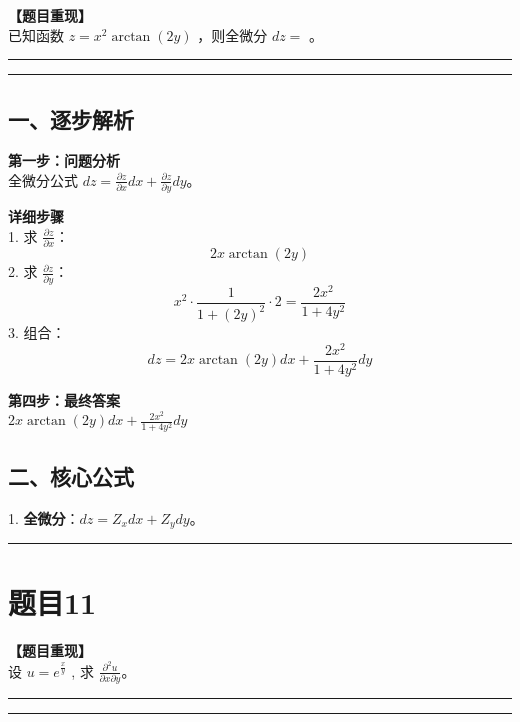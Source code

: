 \documentclass[12pt, a4paper]{ctexart}
\newcommand{\TopSeparator}{
    \par\noindent\rule{\textwidth}{1.5pt}\vspace{0.5em} %
}
\newcommand{\AnalysisSeparator}{
    \par\noindent\rule{\textwidth}{0.5pt}\vspace{0.2em}\hrule\vspace{0.5em} %
}
\newenvironment{RedAnalysis}{
    \par
    \color{red} %
}{
    \par
    \color{black} %
}
\begin{document}
\textbf{【题目重现】} \\
已知函数 $ z = x^{2} \arctan(2y) $ ，则全微分 $ dz = $ \underline{\hspace{2cm}}。

\AnalysisSeparator

\begin{RedAnalysis}

\subsection*{一、逐步解析}

\textbf{第一步：问题分析} \\
全微分公式 $dz = \frac{\partial z}{\partial x}dx + \frac{\partial z}{\partial y}dy$。

\textbf{详细步骤} \\
1. 求 $\frac{\partial z}{\partial x}$：
   \[ 2x \arctan(2y) \]
2. 求 $\frac{\partial z}{\partial y}$：
   \[ x^2 \cdot \frac{1}{1+(2y)^2} \cdot 2 = \frac{2x^2}{1+4y^2} \]
3. 组合：
   \[ dz = 2x \arctan(2y) dx + \frac{2x^2}{1+4y^2} dy \]

\textbf{第四步：最终答案} \\
$ 2x \arctan(2y) dx + \frac{2x^2}{1+4y^2} dy $

\subsection*{二、核心公式}
1. \textbf{全微分}：$dz = Z_x dx + Z_y dy$。

\end{RedAnalysis}

\vspace{2em}

\TopSeparator
\section*{题目11}

\textbf{【题目重现】} \\
设 $ u = e^{\frac{x}{y}} $ , 求 $ \frac{\partial^{2}u}{\partial x \partial y} $。

\AnalysisSeparator
\end{document}
